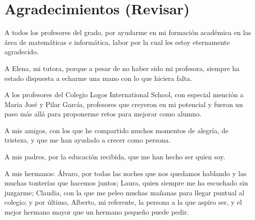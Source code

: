 \chapter*{Agradecimientos (Revisar)} \label{chp:agradecimientos}

A todos los profesores del grado, por ayudarme en mi formación académica en las área de matemáticas e informática, labor por la cual les estoy eternamente agradecido.

A Elena, mi tutora, porque a pesar de no haber sido mi profesora, siempre ha estado dispuesta a echarme una mano con lo que hiciera falta.

A los profesores del Colegio Logos International School, con especial mención a Maria José y Pilar García, profesores que creyeron en mi potencial y fueron un paso más allá para proponerme retos para mejorar como alumno.

A mis amigos, con los que he compartido muchos momentos de alegría, de tristeza, y que me han ayudado a crecer como persona.


A mis padres, por la educación recibida, que me han hecho ser quien soy.

A mis hermanos: Álvaro, por todas las noches que nos quedamos hablando y las muchas tonterías que hacemos juntos; Laura, quien siempre me ha escuchado sin juzgarme; Claudia, con la que me peleo muchas mañanas para llegar puntual al colegio; y por último, Alberto, mi referente, la persona a la que aspiro ser, y el mejor hermano mayor que un hermano pequeño puede pedir.